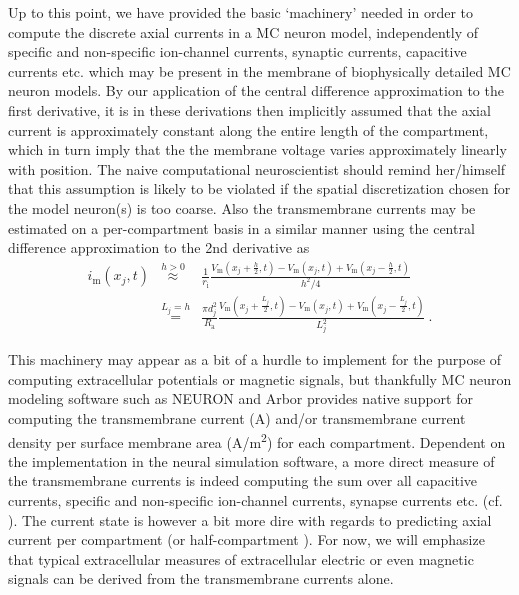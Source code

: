 Up to this point, we have provided the basic `machinery' needed in order to compute the discrete axial currents in a MC neuron model, 
independently of specific and non-specific ion-channel currents, synaptic currents, capacitive currents etc. which may be present in the membrane of biophysically detailed MC neuron models. 
By our application of the central difference approximation to the first derivative, 
it is in these derivations then implicitly assumed that the axial current is approximately constant along the entire length of the compartment, 
which in turn imply that the the membrane voltage varies approximately linearly with position. 
The naive computational neuroscientist should remind her/himself that this assumption is likely to be violated if the spatial discretization chosen for the model neuron(s) is too coarse. 
%
Also the transmembrane currents may be estimated on a per-compartment basis in a similar manner using the central difference approximation to the 2nd derivative as 
%
\begin{eqnarray}
i_\mathrm{m}(x_j, t) &\overset{h>0}{\approx}& \frac{1}{r_\mathrm{i}} \frac{V_\mathrm{m}(x_j + \frac{h}{2}, t) - V_\mathrm{m}(x_j, t)+ V_\mathrm{m}(x_j - \frac{h}{2}, t)}{h^2 / 4} \nonumber \\
		&\overset{L_j=h}{=}& \frac{\pi d_j^2}{R_\mathrm{a}} \frac{V_\mathrm{m}(x_j + \frac{L_j}{2}, t) - V_\mathrm{m}(x_j, t) + V_\mathrm{m}(x_j - \frac{L_j}{2}, t)}{L_j^2} ~.
\label{eq:LFPy_im_discrete}
\end{eqnarray} 


This machinery may appear as a bit of a hurdle to implement for the purpose of computing extracellular potentials or magnetic signals, 
but thankfully MC neuron modeling software such as NEURON and Arbor provides native support for computing the transmembrane current (\si{\ampere}) and/or transmembrane current density per surface membrane area (\si{\ampere/\metre^2}) for each compartment. 
Dependent on the implementation in the neural simulation software, 
a more direct measure of the transmembrane currents is indeed computing the sum over all capacitive currents, specific and non-specific ion-channel currents, synapse currents etc. (cf. ). 
% 
The current state is however a bit more dire with regards to predicting axial current per compartment (or half-compartment \cite{Hagen2018}). 
For now, we will emphasize that typical extracellular measures of extracellular electric or even magnetic signals can be derived from the transmembrane currents alone. 

